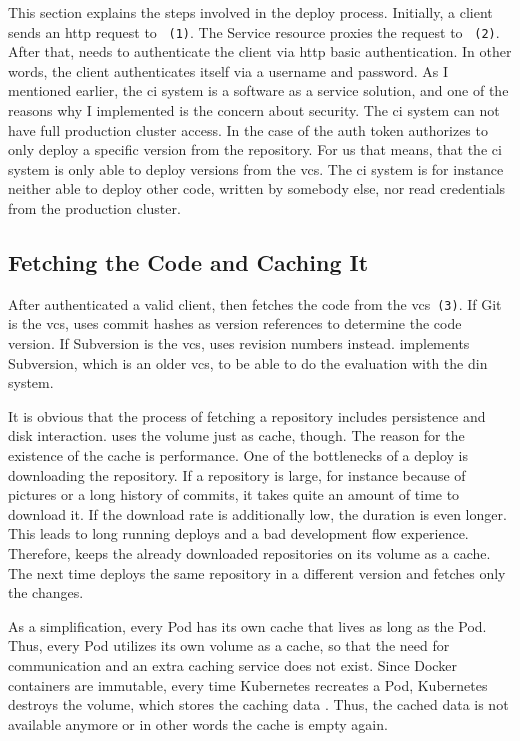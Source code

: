 This section explains the steps involved in the deploy process. Initially, a client
sends an \gls{http} request to \deployer{}~\texttt{(1)}. The Service resource proxies the request
to \deployer{}~\texttt{(2)}. After that, \deployer{} needs to authenticate the client via \gls{http}
basic authentication. In other words, the client authenticates itself via a username and
password. As I mentioned earlier, the \gls{ci} system is a software as a service solution,
and one of the reasons why I implemented \deployer{} is the concern about security. The
\gls{ci} system can not have full production cluster access. In the case of \deployer{} the
auth token authorizes to only deploy a specific version from the repository. For us that
means, that the \gls{ci} system is only able to deploy versions from the \gls{vcs}. The
\gls{ci} system is for instance neither able to deploy other code, written by somebody else, nor read
credentials from the production cluster.

\subsection{Fetching the Code and Caching It}
\label{sec:cache}

After \deployer{} authenticated a valid client, \deployer{} then fetches the code from the
\gls{vcs}~\texttt{(3)}. If Git is the \gls{vcs}, \deployer{} uses commit hashes
as version references to determine the code version. If Subversion is the \gls{vcs},
\deployer{} uses revision numbers instead. \deployer{} implements Subversion, which is an
older \gls{vcs}, to be able to do the evaluation with the \gls{din} system.

It is obvious that the process of fetching a repository includes persistence and disk
interaction. \deployer{} uses the volume just as cache, though. The reason for the existence
of the cache is performance. One of the bottlenecks of a deploy is downloading the
repository. If a repository is large, for instance because of pictures or a long history
of commits, it takes quite an amount of time to download it. If the download rate is
additionally low, the duration is even longer. This leads to long running deploys and a bad
development flow experience. Therefore, \deployer{} keeps the already downloaded repositories
on its volume as a cache. The next time \deployer{} deploys the same repository in a
different version and \deployer{} fetches only the changes.

As a simplification, every Pod has its own cache that lives as long as the Pod. Thus, every
Pod utilizes its own volume as a cache, so that the need for communication and an extra caching
service does not exist. Since Docker containers are immutable, every time Kubernetes
recreates a Pod, Kubernetes destroys the volume, which stores the caching data . Thus, the cached data is not available
anymore or in other words the cache is empty again.

